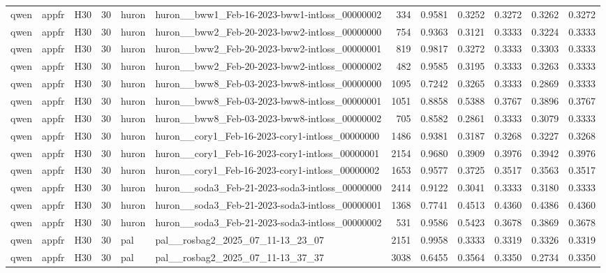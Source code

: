 \begin{table}[tbp]
\begin{tabular}{lllrllrrrrrr}
qwen & appfr & H30 & 30 & huron & huron\_\_bww1\_Feb-16-2023-bww1-intloss\_00000002 & 334 & 0.9581 & 0.3252 & 0.3272 & 0.3262 & 0.3272 \\
qwen & appfr & H30 & 30 & huron & huron\_\_bww2\_Feb-20-2023-bww2-intloss\_00000000 & 754 & 0.9363 & 0.3121 & 0.3333 & 0.3224 & 0.3333 \\
qwen & appfr & H30 & 30 & huron & huron\_\_bww2\_Feb-20-2023-bww2-intloss\_00000001 & 819 & 0.9817 & 0.3272 & 0.3333 & 0.3303 & 0.3333 \\
qwen & appfr & H30 & 30 & huron & huron\_\_bww2\_Feb-20-2023-bww2-intloss\_00000002 & 482 & 0.9585 & 0.3195 & 0.3333 & 0.3263 & 0.3333 \\
qwen & appfr & H30 & 30 & huron & huron\_\_bww8\_Feb-03-2023-bww8-intloss\_00000000 & 1095 & 0.7242 & 0.3265 & 0.3333 & 0.2869 & 0.3333 \\
qwen & appfr & H30 & 30 & huron & huron\_\_bww8\_Feb-03-2023-bww8-intloss\_00000001 & 1051 & 0.8858 & 0.5388 & 0.3767 & 0.3896 & 0.3767 \\
qwen & appfr & H30 & 30 & huron & huron\_\_bww8\_Feb-03-2023-bww8-intloss\_00000002 & 705 & 0.8582 & 0.2861 & 0.3333 & 0.3079 & 0.3333 \\
qwen & appfr & H30 & 30 & huron & huron\_\_cory1\_Feb-16-2023-cory1-intloss\_00000000 & 1486 & 0.9381 & 0.3187 & 0.3268 & 0.3227 & 0.3268 \\
qwen & appfr & H30 & 30 & huron & huron\_\_cory1\_Feb-16-2023-cory1-intloss\_00000001 & 2154 & 0.9680 & 0.3909 & 0.3976 & 0.3942 & 0.3976 \\
qwen & appfr & H30 & 30 & huron & huron\_\_cory1\_Feb-16-2023-cory1-intloss\_00000002 & 1653 & 0.9577 & 0.3725 & 0.3517 & 0.3563 & 0.3517 \\
qwen & appfr & H30 & 30 & huron & huron\_\_soda3\_Feb-21-2023-soda3-intloss\_00000000 & 2414 & 0.9122 & 0.3041 & 0.3333 & 0.3180 & 0.3333 \\
qwen & appfr & H30 & 30 & huron & huron\_\_soda3\_Feb-21-2023-soda3-intloss\_00000001 & 1368 & 0.7741 & 0.4513 & 0.4360 & 0.4386 & 0.4360 \\
qwen & appfr & H30 & 30 & huron & huron\_\_soda3\_Feb-21-2023-soda3-intloss\_00000002 & 531 & 0.9586 & 0.5423 & 0.3678 & 0.3869 & 0.3678 \\
qwen & appfr & H30 & 30 & pal & pal\_\_rosbag2\_2025\_07\_11-13\_23\_07 & 2151 & 0.9958 & 0.3333 & 0.3319 & 0.3326 & 0.3319 \\
qwen & appfr & H30 & 30 & pal & pal\_\_rosbag2\_2025\_07\_11-13\_37\_37 & 3038 & 0.6455 & 0.3564 & 0.3350 & 0.2734 & 0.3350 \\

\end{tabular}
\end{table}

